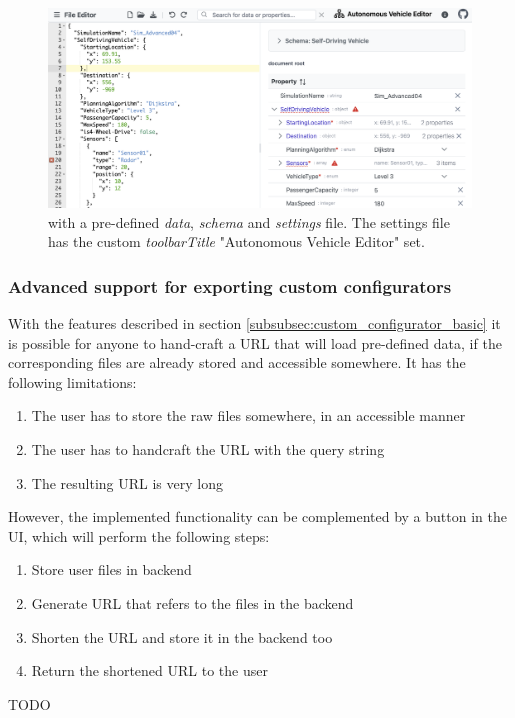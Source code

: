\begin{figure}
    \includegraphics[width=\textwidth]{figures/custom_configurator}
    \caption{\toolname{} with a pre-defined \textit{data}, \textit{schema} and \textit{settings} file. The settings file has the custom \textit{toolbarTitle} "Autonomous Vehicle Editor" set.}
    \label{fig:custom_configurator}
\end{figure}


\subsubsection{Advanced support for exporting custom configurators}

With the features described in section \ref{subsubsec:custom_configurator_basic} it is possible for anyone to hand-craft a \toolname{} URL that will load pre-defined data, if the corresponding files are already stored and accessible somewhere.
It has the following limitations:
\begin{enumerate}
	\item The user has to store the raw files somewhere, in an accessible manner
	\item The user has to handcraft the \toolname{} URL with the query string
	\item The resulting URL is very long
\end{enumerate}

However, the implemented functionality can be complemented by a button in the \toolname{} UI, which will perform the following steps:
\begin{enumerate}
	\item Store user files in backend
	\item Generate URL that refers to the files in the backend
	\item Shorten the URL and store it in the backend too
	\item Return the shortened URL to the user
\end{enumerate}

TODO